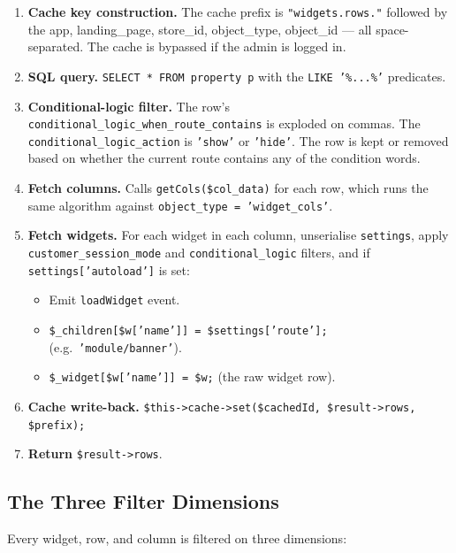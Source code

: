 \documentclass[11pt,a4paper]{article}
\begin{document}
\begin{enumerate}[leftmargin=1.6em,itemsep=2pt]
  \item \textbf{Cache key construction.} The cache prefix is
        \texttt{"widgets.rows."} followed by the app, landing\_page,
        store\_id, object\_type, object\_id --- all space-separated.
        The cache is bypassed if the admin is logged in.
  \item \textbf{SQL query.} \texttt{SELECT * FROM property p} with
        the \texttt{LIKE '\%...\%'} predicates.
  \item \textbf{Conditional-logic filter.} The row's
        \texttt{conditional\_logic\_when\_route\_contains} is
        exploded on commas. The
        \texttt{conditional\_logic\_action} is \texttt{'show'} or
        \texttt{'hide'}. The row is kept or removed based on
        whether the current route contains any of the condition
        words.
  \item \textbf{Fetch columns.} Calls \texttt{getCols(\$col\_data)}
        for each row, which runs the same algorithm against
        \texttt{object\_type = 'widget\_cols'}.
  \item \textbf{Fetch widgets.} For each widget in each column,
        unserialise \texttt{settings}, apply
        \texttt{customer\_session\_mode} and
        \texttt{conditional\_logic} filters, and if
        \texttt{settings['autoload']} is set:
        \begin{itemize}[itemsep=2pt]
          \item Emit \texttt{loadWidget} event.
          \item \texttt{\$\_children[\$w['name']] = \$settings['route'];}
                (e.g.\ \texttt{'module/banner'}).
          \item \texttt{\$\_widget[\$w['name']] = \$w;} (the raw
                widget row).
        \end{itemize}
  \item \textbf{Cache write-back.}
        \texttt{\$this->cache->set(\$cachedId, \$result->rows,
        \$prefix);}
  \item \textbf{Return} \texttt{\$result->rows}.
\end{enumerate}

\subsection{The Three Filter Dimensions}

Every widget, row, and column is filtered on three dimensions:
\end{document}
